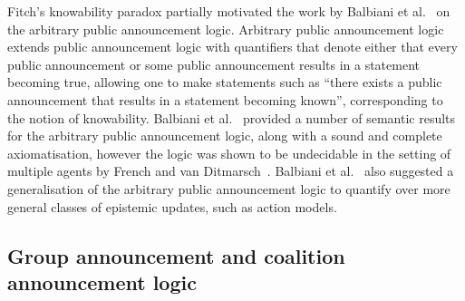 Fitch's knowability paradox partially motivated the work by Balbiani et al.~\cite{balbiani:2007} on the arbitrary public announcement logic.
Arbitrary public announcement logic extends public announcement logic with quantifiers that denote either that every public announcement or some public announcement results in a statement becoming true, allowing one to make statements such as ``there exists a public announcement that results in a statement becoming known'', corresponding to the notion of knowability.
Balbiani et al.~\cite{balbiani:2007} provided a number of semantic results for the arbitrary public announcement logic, along with a sound and complete axiomatisation, however the logic was shown to be undecidable in the setting of multiple agents by French and van Ditmarsch~\cite{french:2008}.
Balbiani et al.~\cite{balbiani:2007} also suggested a generalisation of the arbitrary public announcement logic to quantify over more general classes of epistemic updates, such as action models.


\subsection{Group announcement and coalition announcement logic}

